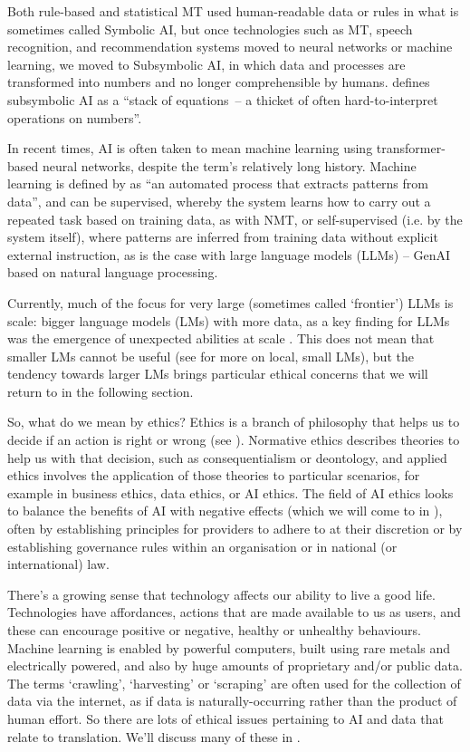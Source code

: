 \documentclass[output=paper]{langscibook}
\begin{document}
Both rule-based and statistical MT used human-readable data or rules in what is sometimes called Symbolic AI, but once technologies such as MT, speech recognition, and recommendation systems moved to neural networks or machine learning, we moved to Subsymbolic AI, in which data and processes are transformed into numbers and no longer comprehensible by humans. \citet[12]{mitchell2020} defines subsymbolic AI as a “stack of equations~-- a thicket of often hard-to-interpret operations on numbers”. 

In recent times, AI is often taken to mean machine learning using transformer-based neural networks, despite the term’s relatively long history. Machine learning is defined by \citet[3]{KelleherMacNameeDArcy15} as “an automated process that extracts patterns from data”, and can be supervised, whereby the system learns how to carry out a repeated task based on training data, as with NMT, or self-supervised (i.e. by the system itself), where patterns are inferred from training data without explicit external instruction, as is the case with large language models (LLMs) – GenAI based on natural language processing.

Currently, much of the focus for very large (sometimes called ‘frontier’) LLMs is scale: bigger language models (LMs) with more data, as a key finding for LLMs was the emergence of unexpected abilities at scale \citep{wei_emergent_2022}. This does not mean that smaller LMs cannot be useful (see \citealt{moorkens_automating_2025} for more on local, small LMs), but the tendency towards larger LMs brings particular ethical concerns that we will return to in the following section.

So, what do we mean by ethics? Ethics is a branch of philosophy that helps us to decide if an action is right or wrong (see \citealt{moorkens_ethics_2024}). Normative ethics describes theories to help us with that decision, such as consequentialism or deontology, and applied ethics involves the application of those theories to particular scenarios, for example in business ethics, data ethics, or AI ethics. The field of AI ethics looks to balance the benefits of AI with negative effects (which we will come to in ), often by establishing principles for providers to adhere to at their discretion or by establishing governance rules within an organisation or in national (or international) law.

There’s a growing sense that technology affects our ability to live a good life. Technologies have affordances, actions that are made available to us as users, and these can encourage positive or negative, healthy or unhealthy behaviours. Machine learning is enabled by powerful computers, built using rare metals and electrically powered, and also by huge amounts of proprietary and/or public data. The terms ‘crawling’, ‘harvesting’ or ‘scraping’ are often used for the collection of data via the internet, as if data is naturally-occurring rather than the product of human effort. So there are lots of ethical issues pertaining to AI and data that relate to translation. We’ll discuss many of these in .
\end{document}
